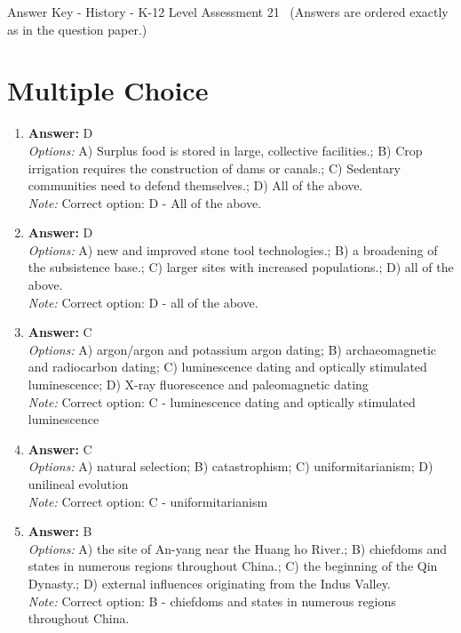 \documentclass[12pt]{article}
\begin{document}
\begin{center}
Answer Key - History - K-12 Level Assessment 21 \
\small (Answers are ordered exactly as in the question paper.)
\end{center}

\section*{Multiple Choice}
\begin{enumerate}[label=\arabic*.]
\item \textbf{Answer:} D
\\ \textit{Options:} A) Surplus food is stored in large, collective facilities.; B) Crop irrigation requires the construction of dams or canals.; C) Sedentary communities need to defend themselves.; D) All of the above.
\\ \textit{Note:} Correct option: D - All of the above.
\item \textbf{Answer:} D
\\ \textit{Options:} A) new and improved stone tool technologies.; B) a broadening of the subsistence base.; C) larger sites with increased populations.; D) all of the above.
\\ \textit{Note:} Correct option: D - all of the above.
\item \textbf{Answer:} C
\\ \textit{Options:} A) argon/argon and potassium argon dating; B) archaeomagnetic and radiocarbon dating; C) luminescence dating and optically stimulated luminescence; D) X-ray fluorescence and paleomagnetic dating
\\ \textit{Note:} Correct option: C - luminescence dating and optically stimulated luminescence
\item \textbf{Answer:} C
\\ \textit{Options:} A) natural selection; B) catastrophism; C) uniformitarianism; D) unilineal evolution
\\ \textit{Note:} Correct option: C - uniformitarianism
\item \textbf{Answer:} B
\\ \textit{Options:} A) the site of An-yang near the Huang ho River.; B) chiefdoms and states in numerous regions throughout China.; C) the beginning of the Qin Dynasty.; D) external influences originating from the Indus Valley.
\\ \textit{Note:} Correct option: B - chiefdoms and states in numerous regions throughout China.
\end{enumerate}
\end{document}
